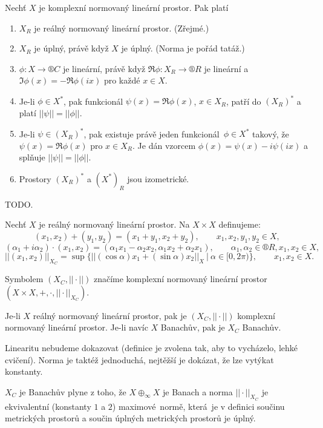 \documentclass[12pt]{article}					%
\begin{document}
\begin{veta}
	Nechť $X$ je komplexní normovaný lineární prostor. Pak platí
	
	\begin{enumerate}
		\item $X_R$ je reálný normovaný lineární prostor. (Zřejmé.)
		\item $X_R$ je úplný, právě když $X$ je úplný. (Norma je pořád tatáž.)
		\item $\phi: X \rightarrow ®C$ je lineární, právě když $\Re \phi: X_R \rightarrow ®R$ je lineární a $\Im \phi(x) = -\Re \phi(ix)$ pro každé $x \in X$.
		\item Je-li $\phi \in X^*$, pak funkcionál $\psi(x) = \Re \phi(x)$, $x \in X_R$, patří do $(X_R)^*$ a platí $||\psi|| = ||\phi||$.
		\item Je-li $\psi \in (X_R)^*$, pak existuje právě jeden funkcionál $\phi \in X^*$ takový, že $\psi(x) = \Re \phi(x)$ pro $x \in X_R$. Je dán vzorcem $\phi(x) = \psi(x) - i\psi(ix)$ a splňuje $||\psi|| = ||\phi||$.
		\item Prostory $(X_R)^*$ a $(X^*)_R$ jsou izometrické.
	\end{enumerate}

	\begin{dukazin}
		TODO.
	\end{dukazin}
\end{veta}

\begin{definice}
	Nechť $X$ je reálný normovaný lineární prostor. Na $X \times X$ definujeme:
	$$ (x_1, x_2) + (y_1, y_2) = (x_1 + y_1, x_2 + y_2), \qquad x_1, x_2, y_1, y_2 \in X, $$
	$$ (\alpha_1 + i\alpha_2)·(x_1, x_2) = (\alpha_1x_1 - \alpha_2x_2, \alpha_1x_2 + \alpha_2 x_1), \qquad \alpha_1, \alpha_2 \in ®R, x_1, x_2 \in X, $$
	$$ ||(x_1, x_2)||_{X_C} = \sup\{||(\cos \alpha)x_1 + (\sin \alpha)x_2||_X\ |\ \alpha \in [0, 2\pi)\}, \qquad x_1, x_2 \in X. $$

	Symbolem $(X_C, ||·||)$ značíme komplexní normovaný lineární prostor $(X \times X, +, ·, ||·||_{X_C})$.
\end{definice}

\begin{veta}[Komplexifikace]
	Je-li $X$ reálný normovaný lineární prostor, pak je $(X_C, ||·||)$ komplexní normovaný lineární prostor. Je-li navíc $X$ Banachův, pak je $X_C$ Banachův.

	\begin{dukazin}
		Linearitu nebudeme dokazovat (definice je zvolena tak, aby to vycházelo, lehké cvičení). Norma je taktéž jednoduchá, nejtěžší je dokázat, že lze vytýkat konstanty.

		$X_C$ je Banachův plyne z toho, že $X \oplus_∞ X$ je Banach a norma $||·||_{X_C}$ je ekvivalentní (konstanty $1$ a $2$) maximové normě, která je v definici součinu metrických prostorů a součin úplných metrických prostorů je úplný.
	\end{dukazin}
\end{veta}
\end{document}
